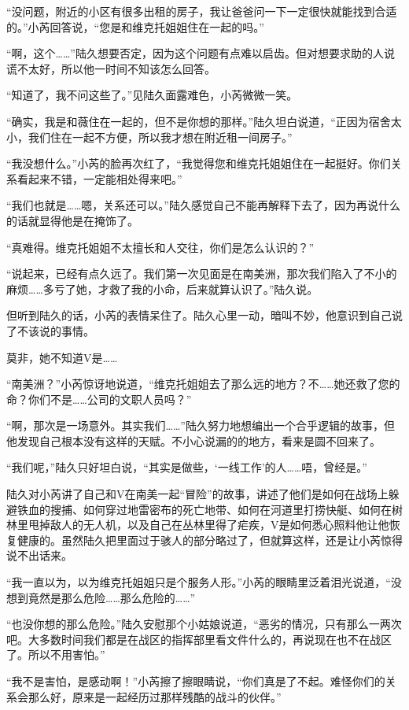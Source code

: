 “没问题，附近的小区有很多出租的房子，我让爸爸问一下一定很快就能找到合适的。”小芮回答说，“您是和维克托姐姐住在一起的吗。”

“啊，这个……”陆久想要否定，因为这个问题有点难以启齿。但对想要求助的人说谎不太好，所以他一时间不知该怎么回答。

“知道了，我不问这些了。”见陆久面露难色，小芮微微一笑。

“确实，我是和薇住在一起的，但不是你想的那样。”陆久坦白说道，“正因为宿舍太小，我们住在一起不方便，所以我才想在附近租一间房子。”

“我没想什么。”小芮的脸再次红了，“我觉得您和维克托姐姐住在一起挺好。你们关系看起来不错，一定能相处得来吧。”

“我们也就是……嗯，关系还可以。”陆久感觉自己不能再解释下去了，因为再说什么的话就显得他是在掩饰了。

“真难得。维克托姐姐不太擅长和人交往，你们是怎么认识的？”

“说起来，已经有点久远了。我们第一次见面是在南美洲，那次我们陷入了不小的麻烦……多亏了她，才救了我的小命，后来就算认识了。”陆久说。

但听到陆久的话，小芮的表情呆住了。陆久心里一动，暗叫不妙，他意识到自己说了不该说的事情。

莫非，她不知道V是……

“南美洲？”小芮惊讶地说道，“维克托姐姐去了那么远的地方？不……她还救了您的命？你们不是……公司的文职人员吗？”

“啊，那次是一场意外。其实我们……”陆久努力地想编出一个合乎逻辑的故事，但他发现自己根本没有这样的天赋。不小心说漏的的地方，看来是圆不回来了。

“我们呢，”陆久只好坦白说，“其实是做些，‘一线工作’的人……唔，曾经是。”

陆久对小芮讲了自己和V在南美一起“冒险”的故事，讲述了他们是如何在战场上躲避铁血的搜捕、如何穿过地雷密布的死亡地带、如何在河道里打捞快艇、如何在树林里甩掉敌人的无人机，以及自己在丛林里得了疟疾，V是如何悉心照料他让他恢复健康的。虽然陆久把里面过于骇人的部分略过了，但就算这样，还是让小芮惊得说不出话来。

“我一直以为，以为维克托姐姐只是个服务人形。”小芮的眼睛里泛着泪光说道，“没想到竟然是那么危险……那么危险的……”

“也没你想的那么危险。”陆久安慰那个小姑娘说道，“恶劣的情况，只有那么一两次吧。大多数时间我们都是在战区的指挥部里看文件什么的，再说现在也不在战区了。所以不用害怕。”

“我不是害怕，是感动啊！”小芮擦了擦眼睛说，“你们真是了不起。难怪你们的关系会那么好，原来是一起经历过那样残酷的战斗的伙伴。”

